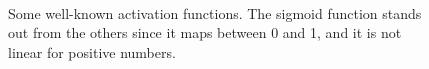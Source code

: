 \begin{figure}
	\centering
	\\
	
	\caption{Some well-known activation functions. The sigmoid function stands out from the others since it maps between 0 and 1, and it is not linear for positive numbers.}%
	\label{fig:activation_functions}%
\end{figure}



